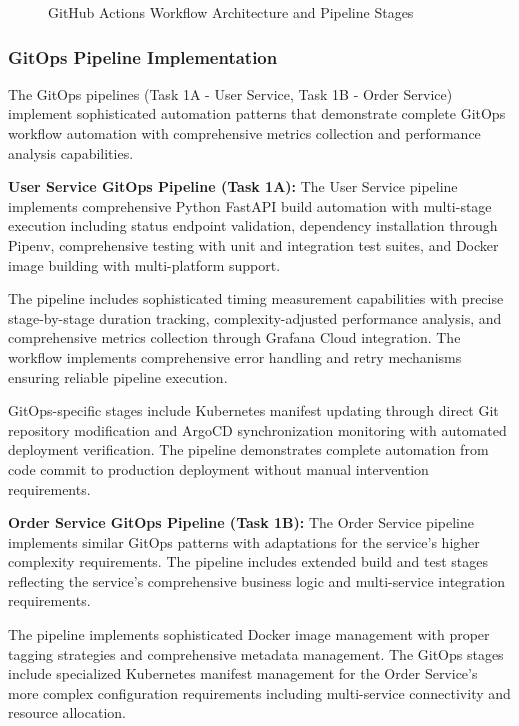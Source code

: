 \begin{figure}[H]
\centering
\caption{GitHub Actions Workflow Architecture and Pipeline Stages}
\label{fig:github-actions-architecture}
\end{figure}

\subsubsection{GitOps Pipeline Implementation}

The GitOps pipelines (Task 1A - User Service, Task 1B - Order Service) implement sophisticated automation patterns that demonstrate complete GitOps workflow automation with comprehensive metrics collection and performance analysis capabilities.

\textbf{User Service GitOps Pipeline (Task 1A):}
The User Service pipeline implements comprehensive Python FastAPI build automation with multi-stage execution including status endpoint validation, dependency installation through Pipenv, comprehensive testing with unit and integration test suites, and Docker image building with multi-platform support.

The pipeline includes sophisticated timing measurement capabilities with precise stage-by-stage duration tracking, complexity-adjusted performance analysis, and comprehensive metrics collection through Grafana Cloud integration. The workflow implements comprehensive error handling and retry mechanisms ensuring reliable pipeline execution.

GitOps-specific stages include Kubernetes manifest updating through direct Git repository modification and ArgoCD synchronization monitoring with automated deployment verification. The pipeline demonstrates complete automation from code commit to production deployment without manual intervention requirements.

\textbf{Order Service GitOps Pipeline (Task 1B):}
The Order Service pipeline implements similar GitOps patterns with adaptations for the service's higher complexity requirements. The pipeline includes extended build and test stages reflecting the service's comprehensive business logic and multi-service integration requirements.

The pipeline implements sophisticated Docker image management with proper tagging strategies and comprehensive metadata management. The GitOps stages include specialized Kubernetes manifest management for the Order Service's more complex configuration requirements including multi-service connectivity and resource allocation.

